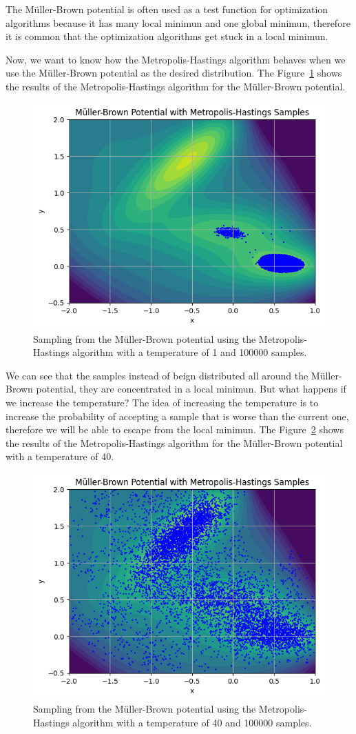 \documentclass{article}
\begin{document}
The Müller-Brown potential is often used as a test function for optimization algorithms because it has many local minimun and one global minimun, therefore it is common that the optimization algorithms get stuck in a local minimun.


Now, we want to know how the Metropolis-Hastings algorithm behaves when we use the Müller-Brown potential as the desired distribution. The Figure~\ref{fig:mullerbrownmh} shows the results of the Metropolis-Hastings algorithm for the Müller-Brown potential.

\begin{figure}[H]
	\centering
	\includegraphics[width=0.5\linewidth]{./Figures/MCMC/mullerbrownmh.png}
	\caption{Sampling from the Müller-Brown potential using the Metropolis-Hastings algorithm with a temperature of 1 and 100000 samples.}
	\label{fig:mullerbrownmh}
\end{figure}

We can see that the samples instead of beign distributed all around the Müller-Brown potential, they are concentrated in a local minimun. But what happens if we increase the temperature? The idea of increasing the temperature is to increase the probability of accepting a sample that is worse than the current one, therefore we will be able to escape from the local minimun. The Figure~\ref{fig:mullerbrownmh2} shows the results of the Metropolis-Hastings algorithm for the Müller-Brown potential with a temperature of 40.

\begin{figure}[H]
	\centering
	\includegraphics[width=0.5\linewidth]{./Figures/MCMC/mullerbrownmh2.png}
	\caption{Sampling from the Müller-Brown potential using the Metropolis-Hastings algorithm with a temperature of 40 and 100000 samples.}
	\label{fig:mullerbrownmh2}
\end{figure}
\end{document}
